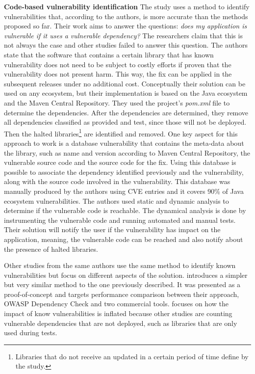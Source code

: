 \documentclass[pdf,bookmarks,colorlinks=true]{IEEEtran}
\begin{document}
\textbf{Code-based vulnerability identification}
The study \cite{Ponta2018} uses a method to identify vulnerabilities that, according to the authors, is more accurate than the methods proposed so far. Their work aims to answer the questions: {\em does my application is vulnerable if it uses a vulnerable dependency?} The researchers claim that this is not always the case and other studies failed to answer this question. The authors state that the software that contains a certain library that has known vulnerability does not need to be subject to costly efforts if proven that the vulnerability does not present harm. This way, the fix can be applied in the subsequent releases under no additional cost. Conceptually their solution can be used on any ecosystem, but their implementation is based on the Java ecosystem and the Maven Central Repository. They used the project’s {\em pom.xml} file to determine the dependencies. After the dependencies are determined, they remove all dependencies classified as provided and test, since those will not be deployed. Then the halted libraries\footnote{Libraries that do not receive an updated in a certain period of time define by the study.} are identified and removed. 
One key aspect for this approach to work is a database vulnerability that contains the meta-data about the library, such as name and version according to Maven Central Repository, the vulnerable source code and the source code for the fix. Using this database is possible to associate the dependency identified previously and the vulnerability, along with the source code involved in the vulnerability. This database was manually produced by the authors using CVE entries and it covers 90\% of Java ecosystem vulnerabilities.
The authors used static and dynamic analysis to determine if the vulnerable code is reachable. The dynamical analysis is done by instrumenting the vulnerable code and running automated and manual tests.
Their solution will notify the user if the vulnerability has impact on the application, meaning, the vulnerable code can be reached and also notify about the presence of halted libraries.

Other studies from the same authors use the same method to identify known vulnerabilities but focus on different aspects of the solution. \cite{Plate2015} introduces a simpler but very similar method to the one previously described. It was presented as a proof-of-concept and targets performance comparison between their approach, OWASP Dependency Check and two commercial tools.  \cite{pashchenko2018esem} focuses on how the impact of know vulnerabilities is inflated because other studies are counting vulnerable dependencies that are not deployed, such as libraries that are only used during tests. 
\end{document}
